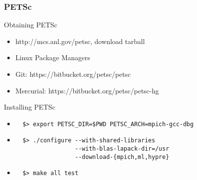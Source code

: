 
\begin{frame}[fragile]
\frametitle{PETSc}
 \begin{block}{Obtaining PETSc}
 \begin{itemize}
  \item http://mcs.anl.gov/petsc, download tarball
  \item Linux Package Managers
  \item Git: https://bitbucket.org/petsc/petsc
  \item Mercurial: https://bitbucket.org/petsc/petsc-hg
 \end{itemize}
 \end{block}

 \begin{block}{Installing PETSc}
 \begin{itemize}
  \item
 \begin{lstlisting}
  $> export PETSC_DIR=$PWD PETSC_ARCH=mpich-gcc-dbg
 \end{lstlisting}
  \item
 \begin{lstlisting}
  $> ./configure --with-shared-libraries
                 --with-blas-lapack-dir=/usr
                 --download-{mpich,ml,hypre}
\end{lstlisting}
  \item 
 \begin{lstlisting}
  $> make all test
 \end{lstlisting}
 \end{itemize}
 \end{block}

\end{frame}

